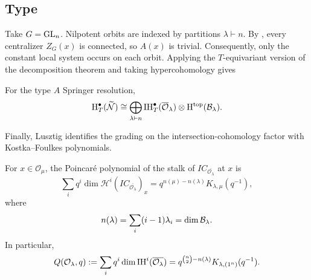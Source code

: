 \subsection{Type }

Take $G=\mathrm{GL}_n$. Nilpotent orbits are indexed by partitions
$\lambda\vdash n$. By , every centralizer
$Z_G(x)$ is connected, so $A(x)$ is trivial. Consequently, only the
constant local system occurs on each orbit. Applying the
$T$-equivariant version of the decomposition theorem and taking
hypercohomology gives
\begin{corollary}{}
  For the type $A$ Springer resolution,
  \[
    \mathrm{H}_T^\bullet(\widetilde{\mathcal N})
    \cong
    \bigoplus_{\lambda\vdash n}
    \mathrm{IH}_T^\bullet(\overline{\mathcal O}_\lambda)
      \otimes\mathrm{H}^\mathrm{top}(\mathcal{B}_\lambda).
  \]
\end{corollary}

Finally, Lusztig identifies the grading on the intersection-cohomology
factor with Kostka--Foulkes polynomials.
\begin{theorem}{\cite{lusztig1981green}}
  For $x\in\mathcal O_\mu$, the Poincar\'e polynomial of the stalk of
  $IC_{\overline{\mathcal O_\lambda}}$ at $x$ is
  \[
    \sum_i q^i
      \dim\mathcal H^i(IC_{\overline{\mathcal O_\lambda}})_x
    =q^{n(\mu)-n(\lambda)}K_{\lambda,\mu}(q^{-1}),
  \]
  where
  \[
    n(\lambda)=\sum_i(i-1)\lambda_i=\dim\mathcal{B}_\lambda.
  \]
  In particular,
  \[
    Q(\mathcal O_\lambda,q)
    :=\sum_iq^i\dim\mathrm{IH}^i(\overline{\mathcal O_\lambda})
    =q^{\binom n2-n(\lambda)}K_{\lambda,(1^n)}(q^{-1}).
  \]
\end{theorem}
